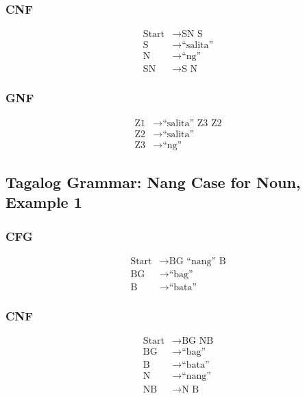 \subsubsection{CNF}
\begin{equation*}
    \begin{aligned}
        \text{Start}   & \rightarrow \text{SN S}   \\
        \text{S} & \rightarrow \text{“salita”} \\
        \text{N} & \rightarrow \text{“ng”} \\
        \text{SN} & \rightarrow \text{S N}
    \end{aligned}
\end{equation*}

\subsubsection{GNF}
\begin{equation*}
    \begin{aligned}
        \text{Z1}   & \rightarrow \text{“salita” Z3 Z2}   \\
        \text{Z2} & \rightarrow \text{“salita”} \\
        \text{Z3} & \rightarrow \text{“ng”}
    \end{aligned}
\end{equation*}

\newpage
\subsection{Tagalog Grammar: Nang Case for Noun, Example 1}
\subsubsection{CFG}
\begin{equation*}
    \begin{aligned}
        \text{Start}   & \rightarrow \text{BG “nang” B}   \\
        \text{BG} & \rightarrow \text{“bag”} \\
        \text{B} & \rightarrow \text{“bata”}
    \end{aligned}
\end{equation*}

\subsubsection{CNF}
\begin{equation*}
    \begin{aligned}
        \text{Start}   & \rightarrow \text{BG NB}   \\
        \text{BG} & \rightarrow \text{“bag”} \\
        \text{B} & \rightarrow \text{“bata”} \\
        \text{N} & \rightarrow \text{“nang”} \\
        \text{NB} & \rightarrow \text{N B}
    \end{aligned}
\end{equation*}

